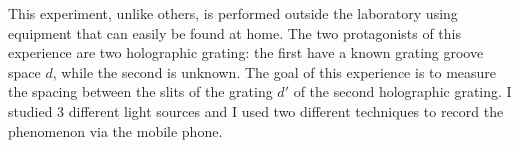This experiment, unlike others, is performed outside the laboratory using equipment that can easily be found at home. The two protagonists of this experience are two holographic grating: the first have a known grating groove space $ d $, while the second is unknown. The goal of this experience is to measure the spacing between the slits of the grating $d'$ of the second holographic grating. I studied 3 different light sources and I used two different techniques to record the phenomenon via the mobile phone.